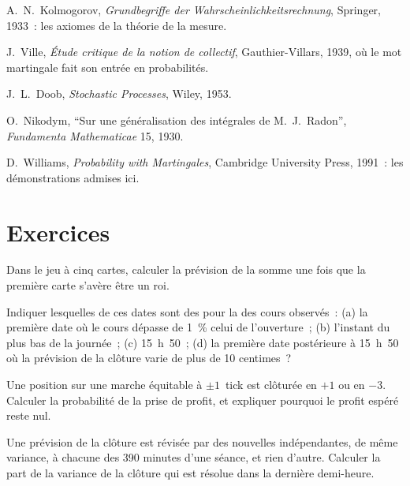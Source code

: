 \begin{omsources}
\item A.~N.~Kolmogorov, \emph{Grundbegriffe der Wahrscheinlichkeitsrechnung}, Springer,
1933~: les axiomes de la théorie de la mesure.
\item J.~Ville, \emph{Étude critique de la notion de collectif}, Gauthier-Villars, 1939,
où le mot martingale fait son entrée en probabilités.
\item J.~L.~Doob, \emph{Stochastic Processes}, Wiley, 1953.
\item O.~Nikodym, ``Sur une généralisation des intégrales de M.~J.~Radon'', \emph{Fundamenta
Mathematicae} 15, 1930.
\item D.~Williams, \emph{Probability with Martingales}, Cambridge University Press, 1991~: les
démonstrations admises ici.
\end{omsources}

\section{Exercices}

\begin{exercise}[$\star$]\label{exo:qm:probability-at-speed:1}
Dans le jeu à cinq cartes, calculer la prévision de la somme une fois que la première carte
s'avère être un roi.
\end{exercise}

\begin{exercise}[$\star$]\label{exo:qm:probability-at-speed:2}
Indiquer lesquelles de ces dates sont des  pour la  des cours observés~: (a) la première date
où le cours dépasse de 1~\% celui de l'ouverture~; (b) l'instant du plus bas de la journée~; (c) 15~h~50~; (d) la première
date postérieure à 15~h~50 où la prévision de la clôture varie de plus de 10 centimes~?
\end{exercise}

\begin{exercise}[$\star$]\label{exo:qm:probability-at-speed:3}
Une position sur une marche équitable à $\pm1$~tick est clôturée en $+1$ ou en $-3$. Calculer la
probabilité de la prise de profit, et expliquer pourquoi le profit espéré reste nul.
\end{exercise}

\begin{exercise}[$\star\star$]\label{exo:qm:probability-at-speed:4}
Une prévision de la clôture est révisée par des nouvelles indépendantes, de même variance, à chacune des 390
minutes d'une séance, et rien d'autre. Calculer la part de la variance de la clôture qui est résolue
dans la dernière demi-heure.
\end{exercise}

